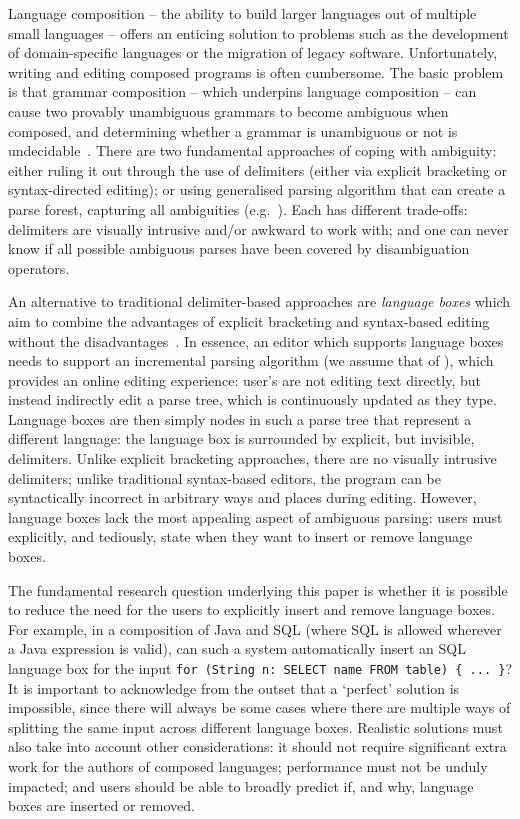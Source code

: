 \documentclass[sigplan,screen]{acmart}\settopmatter{printfolios=true,printccs=false,printacmref=false}
\begin{document}
Language composition -- the ability to build larger languages out of multiple
small languages -- offers an enticing solution to problems such as the
development of domain-specific languages or the migration of legacy software.
Unfortunately, writing and editing composed programs is often cumbersome.
The basic problem is that grammar
composition -- which underpins language composition -- can cause
two provably unambiguous grammars to become ambiguous when composed,
and determining whether a grammar is unambiguous or not is
undecidable~\cite{cantor62ambiguity}. There are two fundamental approaches
of coping with ambiguity: either ruling it out through the use of
delimiters (either via explicit bracketing or syntax-directed
editing); or using generalised parsing algorithm that can create a parse
forest, capturing all ambiguities
(e.g.~\cite{visser97scannerless}). Each has different trade-offs: delimiters
are visually intrusive and/or awkward to work with; and one can never know if all possible
ambiguous parses have been covered by disambiguation operators.

An alternative to traditional delimiter-based approaches are \emph{language boxes} which aim to
combine the advantages of explicit bracketing and syntax-based
editing without the disadvantages~\cite{diekmann14eco}. In essence, an editor
which supports language boxes needs to support an incremental parsing algorithm
(we assume that of \citet{wagner98practicalalgorithms}), which provides an
online editing experience: user's are not editing text directly, but instead
indirectly edit a parse tree, which is continuously updated as they type.
Language boxes are then simply nodes in such a parse
tree that represent a different language: the language box is surrounded by
explicit, but invisible, delimiters. Unlike explicit bracketing approaches,
there are no visually intrusive delimiters; unlike traditional
syntax-based editors, the program can be syntactically incorrect in arbitrary
ways and places during editing. However, language boxes lack the most appealing aspect of
ambiguous parsing: users must explicitly, and tediously, state when they want
to insert or remove language boxes.

The fundamental research question underlying this paper is whether it is
possible to reduce the need for the users to explicitly insert and remove language
boxes. For example, in a composition of Java and SQL (where SQL is allowed
wherever a Java expression is valid), can such a system automatically insert an
SQL language box for the input \texttt{for (String n: SELECT name FROM table) \{ ...
\}}? It is important to acknowledge from the outset that a `perfect' solution
is impossible, since there will always be some cases where there are multiple
ways of splitting the same input across different language boxes. Realistic
solutions must also take into account other considerations: it should not
require significant extra work for the authors of composed languages; performance must
not be unduly impacted; and users should be able to broadly predict if, and
why, language boxes are inserted or removed.
\end{document}
